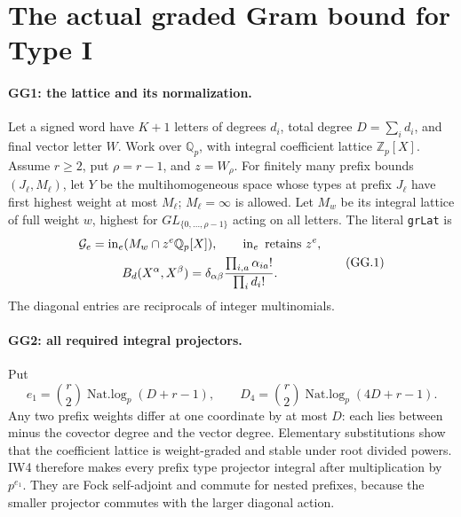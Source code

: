 \section{The actual graded Gram bound for Type I}
\label{sec:graded-gram}


\paragraph{GG1: the lattice and its normalization.}
Let a signed word have $K+1$ letters of degrees $d_i$, total degree
$D=\sum_i d_i$, and final vector letter $W$. Work over $\mathbb Q_p$,
with integral coefficient lattice $\mathbb Z_p[X]$.
Assume $r\ge2$, put $\rho=r-1$, and $z=W_\rho$.
For finitely many prefix bounds $(J_\ell,M_\ell)$, let $Y$ be the
multihomogeneous space whose types at prefix $J_\ell$ have first
highest weight at most $M_\ell$; $M_\ell=\infty$ is allowed.
Let $M_w$ be its integral lattice of full weight $w$, highest for
$GL_{\{0,\ldots,\rho-1\}}$ acting on all letters. The literal
\texttt{grLat} is
\[
 \begin{gathered}
 {\cal G}_e=\operatorname{in}_e(M_w\cap z^e\mathbb Q_p[X]),\qquad
 \operatorname{in}_e\text{ retains }z^e,\\
 B_d(X^\alpha,X^\beta)=
 \delta_{\alpha\beta}\frac{\prod_{i,a}\alpha_{ia}!}{\prod_i d_i!}.
 \end{gathered}
                                                               \tag{GG.1}
\]
The diagonal entries are reciprocals of integer multinomials.

\paragraph{GG2: all required integral projectors.}
Put
\[
 e_1=\binom r2\operatorname{Nat.log}_p(D+r-1),\qquad
 D_4=\binom r2\operatorname{Nat.log}_p(4D+r-1).                  \tag{GG.2}
\]
Any two prefix weights differ at one coordinate by at most $D$:
each lies between minus the covector degree and the vector degree.
Elementary substitutions show that the coefficient lattice is
weight-graded and stable under root divided powers. IW4 therefore
makes every prefix type projector integral after multiplication by
$p^{e_1}$. They are Fock self-adjoint and commute for nested prefixes,
because the smaller projector commutes with the larger diagonal action.

